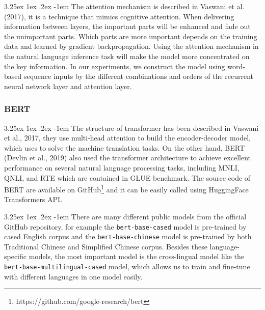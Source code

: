 \documentclass[12pt]{article}
\makeatletter
\renewcommand\paragraph{\@startsection{paragraph}{5}{\z@}%
  {3.25ex \@plus1ex \@minus.2ex}%
  {-1em}%
  {\normalfont\normalsize\bfseries}}
\makeatother
\begin{document}
\begin{CJK*}{UTF8}{bkai}
\begin{spacing}{1.77}


\paragraph{}
The attention mechanism is described in Vaswani et al. (2017), it is a technique that mimics cognitive attention. When delivering information between layers, the important parts will be enhanced and fade out the unimportant parts. Which parts are more important depends on the training data and learned by gradient backpropagation. Using the attention mechanism in the natural language inference task will make the model more concentrated on the key information. In our experiments, we construct the model using word-based sequence inputs by the different combinations and orders of the recurrent neural network layer and attention layer.

\subsubsection{BERT}
\paragraph{}
The structure of transformer\cite{vaswani2017attention} has been described in Vaswani et al., 2017, they use multi-head attention to build the encoder-decoder model, which uses to solve the machine translation tasks. On the other hand, BERT\cite{devlin2018bert} (Devlin et al., 2019) also used the transformer architecture to achieve excellent performance on several natural language processing tasks, including MNLI, QNLI, and RTE which are contained in GLUE benchmark. The source code of BERT are available on GitHub\footnote{https://github.com/google-research/bert} and it can be easily called using HuggingFace Transformers API\cite{wolf-etal-2020-transformers}.

\paragraph{}
There are many different public models from the official GitHub repository, for example the \texttt{bert-base-cased} model is pre-trained by cased English corpus and the \texttt{bert-base-chinese} model is pre-trained by both Traditional Chinese and Simplified Chinese corpus. Besides these language-specific models, the most important model is the cross-lingual model like the \texttt{bert-base-multilingual-cased} model, which allows us to train and fine-tune with different languages in one model easily.


\end{spacing}
\end{CJK*}
\end{document}
